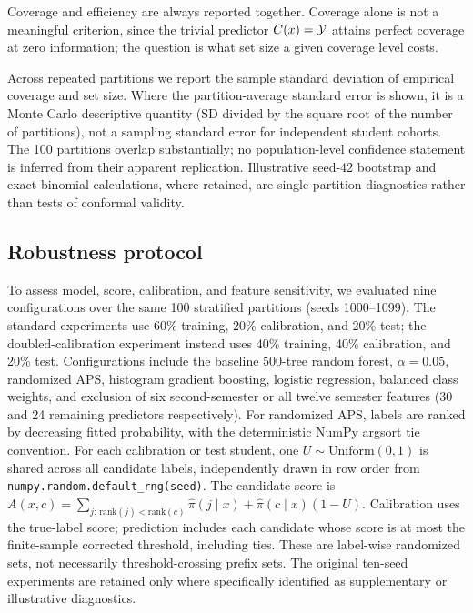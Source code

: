Coverage and efficiency are always reported together. Coverage alone is not a
meaningful criterion, since the trivial predictor $C(x) = \mathcal{Y}$ attains perfect
coverage at zero information; the question is what set size a given coverage
level costs.

Across repeated partitions we report the sample standard deviation of empirical
coverage and set size. Where the partition-average standard error is shown,
it is a Monte Carlo descriptive quantity (SD divided by the square root of
the number of partitions), not a sampling standard error for independent
student cohorts. The 100 partitions overlap substantially; no population-level
confidence statement is inferred from their apparent replication. Illustrative
seed-42 bootstrap and exact-binomial calculations, where retained, are
single-partition diagnostics rather than tests of conformal validity.

\subsection{Robustness protocol}\label{sec:robustness}

To assess model, score, calibration, and feature sensitivity, we evaluated
nine configurations over the same 100 stratified partitions (seeds 1000--1099).
The standard experiments use 60\% training, 20\% calibration, and 20\% test;
the doubled-calibration experiment instead uses 40\% training, 40\% calibration,
and 20\% test. Configurations include the baseline 500-tree random forest,
$\alpha=0.05$, randomized APS, histogram gradient boosting, logistic
regression, balanced class weights, and exclusion of six second-semester or
all twelve semester features (30 and 24 remaining predictors respectively).
For randomized APS, labels are ranked by decreasing fitted probability,
with the deterministic NumPy argsort tie convention. For each calibration
or test student, one $U\sim\mathrm{Uniform}(0,1)$ is shared across all
candidate labels, independently drawn in row order from
\texttt{numpy.random.default\_rng(seed)}. The candidate score is
$A(x,c)=\sum_{j:\,\mathrm{rank}(j)<\mathrm{rank}(c)}\hat\pi(j\mid x)
+\hat\pi(c\mid x)(1-U)$. Calibration uses the true-label score;
prediction includes each candidate whose score is at most the finite-sample
corrected threshold, including ties. These are label-wise randomized sets,
not necessarily threshold-crossing prefix sets. The original ten-seed
experiments are retained only where specifically identified as supplementary
or illustrative diagnostics.

